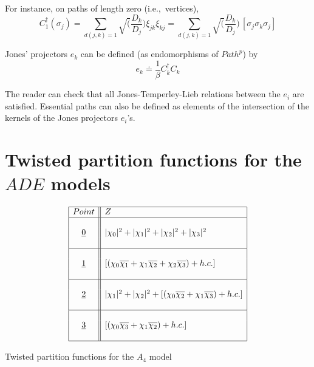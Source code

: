 \documentclass[a4paper,11pt]{article}
\let\sect=\section
\def\section{\newpage\sect}
\def\ie{{\rm i.e.,\/}\ }
\newcommand{\ud}[1]{\underline{#1}}
\newcommand{\xa}[1]{|\chi_{#1}|^2}
\newcommand{\xx}[2]{\chi_{#1}\overline{\chi_{#2}}}
\begin{document}
For instance, on paths of length zero (\ie vertices),
$$
C^{\dag}_{1} (\sigma_{j}) = \sum_{d(j,k)=1}
\sqrt(\frac{D_{k}}{D_{j}}) \xi_{jk}\xi_{kj} = \sum_{d(j,k)=1}
\sqrt(\frac{D_{k}}{D_{j}}) \, [\sigma_{j}\sigma_{k}\sigma_{j}]
$$

Jones' projectors $e_{k}$ can be defined (as endomorphisms of
$Path^p$) by
$$
e_{k} \doteq \frac{1}{\beta} C^{\dag}_{k} C_{k}
$$

The reader can check that all Jones-Temperley-Lieb relations
between the $e_i$ are satisfied.
Essential paths can also be defined as elements of the intersection of the
kernels of the Jones projectors $e_{i}$'s.






\section{Twisted partition functions for the $ADE$ models}



\begin{table}[hhh]
$$
\begin{array}{|c||l|}
\hline
Point & Z \\
\hline
{}   & {} \\
\ud0 & \xa{0} + \xa{1} + \xa{2} + \xa{3} \\
{}   & {} \\
\hline
{}   & {} \\
\ud1 & [(\xx{0}{1} + \xx{1}{2} + \xx{2}{3}) + h.c.] \\
{}   & {} \\
\hline
{}   & {} \\
\ud2 & \xa{1} + \xa{2} + [(\xx{0}{2} + \xx{1}{3}) + h.c.]  \\
{}   & {} \\
\hline
{}   & {} \\
\ud3 & [(\xx{0}{3} + \xx{1}{2}) + h.c.] \\
{}   & {} \\
\hline
\end{array}
$$
\normalsize
\caption{Twisted partition functions for the $A_4$ model}
\end{table}






\end{document}
